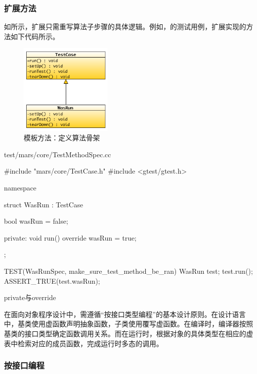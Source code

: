 \begin{content}
\subsubsection{扩展方法}

如所示，扩展只需重写算法子步骤的具体逻辑。例如，的测试用例，扩展实现的方法如下代码所示。

\begin{figure}[H]
\centering
\includegraphics[width=0.4\textwidth]{figures/xunit/simple-test.png}
\caption{模板方法：定义算法骨架}
 \label{fig:simple-test}
\end{figure}

\begin{nodiff}{test/mars/core/TestMethodSpec.cc}
 \begin{c++}
#include "mars/core/TestCase.h"
#include <gtest/gtest.h>

namespace {
  struct WasRun : TestCase {
    bool wasRun = false;

  private:
    void run() override {
      wasRun = true;
    }
  };
}

TEST(WasRunSpec, make_sure_test_method_be_ran) {
  WasRun test;
  test.run();
  ASSERT_TRUE(test.wasRun);
}
  \end{c++}
\end{nodiff}

\begin{episode}{private与override}
\begin{content}

在面向对象程序设计中，需遵循“按接口类型编程”的基本设计原则。在设计语言中，基类使用虚函数声明抽象函数，子类使用覆写虚函数。在编译时，编译器按照基类的接口类型确定函数调用关系。而在运行时，根据对象的具体类型在相应的虚表中检索对应的成员函数，完成运行时多态的调用。

\subsubsection{按接口编程}


\end{content}
\end{episode}
\end{content}
